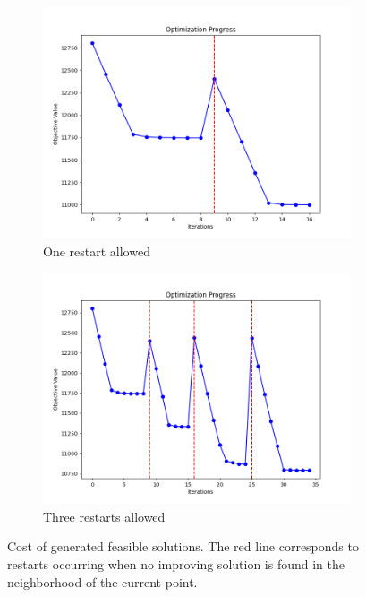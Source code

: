 \documentclass{article}
\begin{document}
\begin{figure}[H]
    \centering
    \begin{subfigure}[t]{0.45\textwidth}  %
        \centering
        \includegraphics[width=\textwidth]{img/1_restart.png}
        \caption{One restart allowed}
    \end{subfigure}
    \hspace{1cm} %
    \begin{subfigure}[t]{0.45\textwidth}
        \centering
        \includegraphics[width=\textwidth]{img/3_restarts.png}
        \caption{Three restarts allowed}
    \end{subfigure}
    \caption{Cost of generated feasible solutions. The red line corresponds to restarts occurring when no improving solution is found in the neighborhood of the current point.}
    \label{GRASP}
\end{figure}
\end{document}
